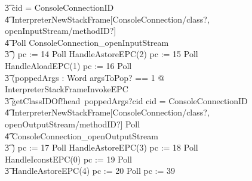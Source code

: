 \begin{figure}[tp!]
{\begin{circus}
    \t3 \circif cid = ConsoleConnectionID \circthen {} \\
    \t4 \lschexpract InterpreterNewStackFrame[ConsoleConnection/class?, openInputStream/methodID?] \rschexpract \circseq \\
    \t4 Poll \circseq ConsoleConnection\_openInputStream \\
    \t3 \circfi) \circseq pc := 14 \circseq Poll \circseq HandleAstoreEPC(2) \circseq pc := 15 \circseq Poll \circseq HandleAloadEPC(1) \circseq pc := 16 \circseq Poll \circseq \\
    \t3 (\circvar poppedArgs : Word \circspot \lschexpract \exists argsToPop? == 1 @ InterpreterStackFrameInvokeEPC \rschexpract \circseq \\
    \t3 getClassIDOf!head~poppedArgs?cid \then \circif cid = ConsoleConnectionID \circthen {} \\
    \t4 \lschexpract InterpreterNewStackFrame[ConsoleConnection/class?, openOutputStream/methodID?] \rschexpract \circseq Poll \circseq \\
    \t4 ConsoleConnection\_openOutputStream \\
    \t3 \circfi) \circseq pc := 17 \circseq Poll \circseq HandleAstoreEPC(3) \circseq pc := 18 \circseq Poll \circseq HandleIconstEPC(0) \circseq pc := 19 \circseq Poll \circseq \\
    \t3 HandleAstoreEPC(4) \circseq pc := 20 \circseq Poll \circseq pc := 39 \\

\end{circus}}
\end{figure}
